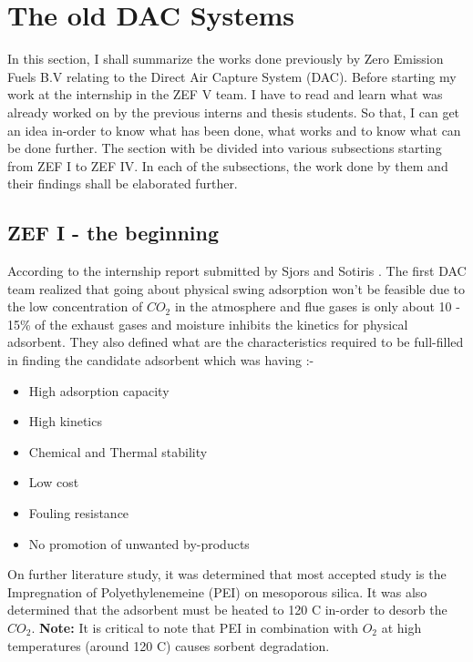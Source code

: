 \section{The old DAC Systems}

In this section, I shall summarize the works done previously by Zero Emission Fuels B.V relating to the Direct Air Capture System (DAC). Before starting my work at the internship in the ZEF V team. I have to read and learn what was already worked on by the previous interns and thesis students. So that, I can get an idea in-order to know what has been done, what works and to know what can be done further. The section with be divided into various subsections starting from ZEF I to ZEF IV. In each of the subsections, the work done by them and their findings shall be elaborated further. 

\subsection{ZEF I - the beginning}

According to the internship report submitted by Sjors and Sotiris \cite{Wagenaar2018}. The first DAC team realized that going about physical swing adsorption won't be feasible due to the low concentration of $CO_2$ in the atmosphere and flue gases is only about 10 - 15\% of the exhaust gases and moisture inhibits the kinetics for physical adsorbent. They also defined what are the characteristics required to be full-filled in finding the candidate adsorbent which was having :-

\begin{itemize}
    \item High adsorption capacity
    \item High kinetics 
    \item Chemical and Thermal stability
    \item Low cost 
    \item Fouling resistance 
    \item No promotion of unwanted by-products
\end{itemize}

On further literature study, it was determined that most accepted study is the Impregnation of Polyethylenemeine (PEI) on mesoporous silica. It was also determined that the adsorbent must be heated to 120 \degree C  in-order to desorb the $CO_2$. \textbf{Note:} It is critical to note that PEI in combination with $O_2$ at high temperatures (around 120 \degree C) causes sorbent degradation. 

